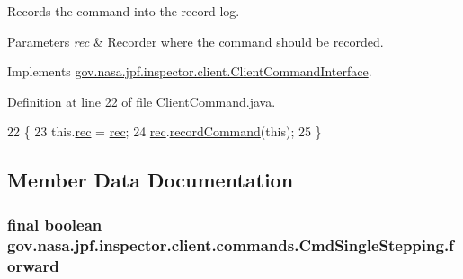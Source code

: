 Records the command into the record log. 


\begin{DoxyParams}{Parameters}
{\em rec} & Recorder where the command should be recorded. \\
\hline
\end{DoxyParams}


Implements \hyperlink{interfacegov_1_1nasa_1_1jpf_1_1inspector_1_1client_1_1_client_command_interface_a4ae9ac9bbb61d9a758ef168e8b3b04ff}{gov.\+nasa.\+jpf.\+inspector.\+client.\+Client\+Command\+Interface}.



Definition at line 22 of file Client\+Command.\+java.


\begin{DoxyCode}
22                                                   \{
23     this.\hyperlink{classgov_1_1nasa_1_1jpf_1_1inspector_1_1client_1_1_client_command_af4246f2427035c72a6af45a2c61361f7}{rec} = \hyperlink{classgov_1_1nasa_1_1jpf_1_1inspector_1_1client_1_1_client_command_af4246f2427035c72a6af45a2c61361f7}{rec};
24     \hyperlink{classgov_1_1nasa_1_1jpf_1_1inspector_1_1client_1_1_client_command_af4246f2427035c72a6af45a2c61361f7}{rec}.\hyperlink{classgov_1_1nasa_1_1jpf_1_1inspector_1_1client_1_1_command_recorder_af5f212124179773e46c8b45f1d01a32d}{recordCommand}(\textcolor{keyword}{this});
25   \}
\end{DoxyCode}


\subsection{Member Data Documentation}
\subsubsection[{\texorpdfstring{forward}{forward}}]{\setlength{\rightskip}{0pt plus 5cm}final boolean gov.\+nasa.\+jpf.\+inspector.\+client.\+commands.\+Cmd\+Single\+Stepping.\+forward\hspace{0.3cm}{\ttfamily [private]}}\hypertarget{classgov_1_1nasa_1_1jpf_1_1inspector_1_1client_1_1commands_1_1_cmd_single_stepping_af3bd26b0ee3e4a353b369b84e61db07c}{}\label{classgov_1_1nasa_1_1jpf_1_1inspector_1_1client_1_1commands_1_1_cmd_single_stepping_af3bd26b0ee3e4a353b369b84e61db07c}


